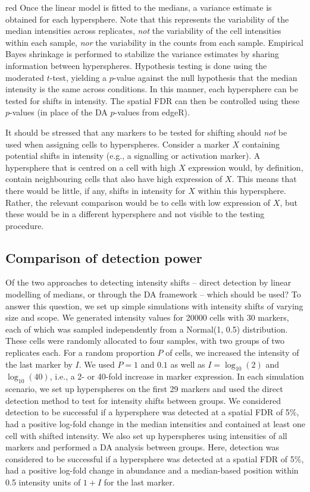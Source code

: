 \documentclass{article}
\begin{document}
\begin{color}{red}
Once the linear model is fitted to the medians, a variance estimate is obtained for each hypersphere.
Note that this represents the variability of the median intensities across replicates, \textit{not} the variability of the cell intensities within each sample, \textit{nor} the variability in the counts from each sample.
Empirical Bayes shrinkage is performed to stabilize the variance estimates by sharing information between hyperspheres.
Hypothesis testing is done using the moderated $t$-test, yielding a $p$-value against the null hypothesis that the median intensity is the same across conditions. 
In this manner, each hypersphere can be tested for shifts in intensity.
The spatial FDR can then be controlled using these $p$-values (in place of the DA $p$-values from edgeR). 

It should be stressed that any markers to be tested for shifting should \textit{not} be used when assigning cells to hyperspheres.
Consider a marker $X$ containing potential shifts in intensity (e.g., a signalling or activation marker).
A hypersphere that is centred on a cell with high $X$ expression would, by definition, contain neighbouring cells that also have high expression of $X$.
This means that there would be little, if any, shifts in intensity for $X$ within this hypersphere.
Rather, the relevant comparison would be to cells with low expression of $X$, but these would be in a different hypersphere and not visible to the testing procedure.

\subsection{Comparison of detection power}
Of the two approaches to detecting intensity shifts -- direct detection by linear modelling of medians, or through the DA framework -- which should be used?
To answer this question, we set up simple simulations with intensity shifts of varying size and scope.
We generated intensity values for 20000 cells with 30 markers, each of which was sampled independently from a Normal(1, 0.5) distribution.
These cells were randomly allocated to four samples, with two groups of two replicates each.
For a random proportion $P$ of cells, we increased the intensity of the last marker by $I$.
We used $P=1$ and $0.1$ as well as $I=\log_{10}(2)$ and $\log_{10}(40)$, i.e., a 2- or 40-fold increase in marker expression.
In each simulation scenario, we set up hyperspheres on the first 29 markers and used the direct detection method to test for intensity shifts between groups.
We considered detection to be successful if a hypersphere was detected at a spatial FDR of 5\%, had a positive log-fold change in the median intensities and contained at least one cell with shifted intensity.
We also set up hyperspheres using intensities of all markers and performed a DA analysis between groups.
Here, detection was considered to be successful if a hypersphere was detected at a spatial FDR of 5\%, had a positive log-fold change in abundance and a median-based position within 0.5 intensity units of $1+I$ for the last marker.


\end{color}
\end{document}
